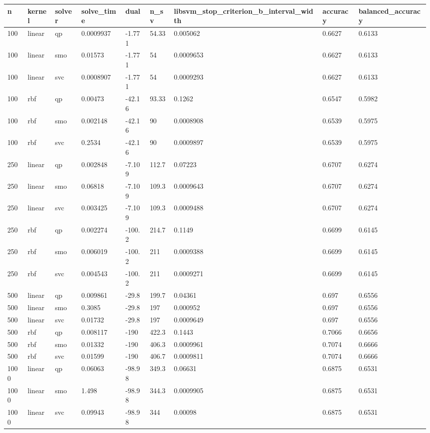 \begin{tabular}{lllllllll}
\hline
n & kernel & solver & solve\_time & dual & n\_sv & libsvm\_stop\_criterion\_b\_interval\_width & accuracy & balanced\_accuracy \\
\hline
100 & linear & qp & 0.0009937 & -1.771 & 54.33 & 0.005062 & 0.6627 & 0.6133 \\
100 & linear & smo & 0.01573 & -1.771 & 54 & 0.0009653 & 0.6627 & 0.6133 \\
100 & linear & svc & 0.0008907 & -1.771 & 54 & 0.0009293 & 0.6627 & 0.6133 \\
100 & rbf & qp & 0.00473 & -42.16 & 93.33 & 0.1262 & 0.6547 & 0.5982 \\
100 & rbf & smo & 0.002148 & -42.16 & 90 & 0.0008908 & 0.6539 & 0.5975 \\
100 & rbf & svc & 0.2534 & -42.16 & 90 & 0.0009897 & 0.6539 & 0.5975 \\
250 & linear & qp & 0.002848 & -7.109 & 112.7 & 0.07223 & 0.6707 & 0.6274 \\
250 & linear & smo & 0.06818 & -7.109 & 109.3 & 0.0009643 & 0.6707 & 0.6274 \\
250 & linear & svc & 0.003425 & -7.109 & 109.3 & 0.0009488 & 0.6707 & 0.6274 \\
250 & rbf & qp & 0.002274 & -100.2 & 214.7 & 0.1149 & 0.6699 & 0.6145 \\
250 & rbf & smo & 0.006019 & -100.2 & 211 & 0.0009388 & 0.6699 & 0.6145 \\
250 & rbf & svc & 0.004543 & -100.2 & 211 & 0.0009271 & 0.6699 & 0.6145 \\
500 & linear & qp & 0.009861 & -29.8 & 199.7 & 0.04361 & 0.697 & 0.6556 \\
500 & linear & smo & 0.3085 & -29.8 & 197 & 0.000952 & 0.697 & 0.6556 \\
500 & linear & svc & 0.01732 & -29.8 & 197 & 0.0009649 & 0.697 & 0.6556 \\
500 & rbf & qp & 0.008117 & -190 & 422.3 & 0.1443 & 0.7066 & 0.6656 \\
500 & rbf & smo & 0.01332 & -190 & 406.3 & 0.0009961 & 0.7074 & 0.6666 \\
500 & rbf & svc & 0.01599 & -190 & 406.7 & 0.0009811 & 0.7074 & 0.6666 \\
1000 & linear & qp & 0.06063 & -98.98 & 349.3 & 0.06631 & 0.6875 & 0.6531 \\
1000 & linear & smo & 1.498 & -98.98 & 344.3 & 0.0009905 & 0.6875 & 0.6531 \\
1000 & linear & svc & 0.09943 & -98.98 & 344 & 0.00098 & 0.6875 & 0.6531 \\

\end{tabular}
